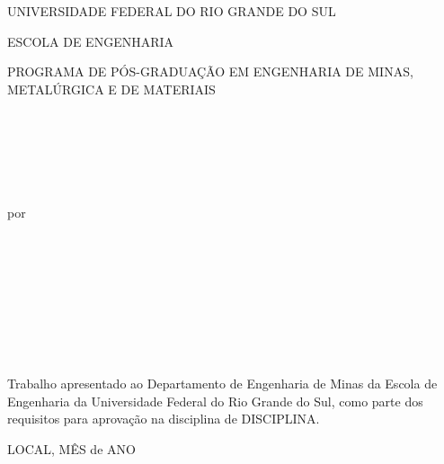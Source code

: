 \renewcommand{\imprimircapa}{%
\begin{capa}%
\center
  UNIVERSIDADE FEDERAL DO RIO GRANDE DO SUL
  \par
ESCOLA DE ENGENHARIA
  \par
  PROGRAMA DE PÓS-GRADUAÇÃO EM ENGENHARIA DE MINAS, METALÚRGICA E DE MATERIAIS 
\\~\\~\\~\\~\\
\imprimirtitulo
\\~\\
por\\~\\~\\
\imprimirautor
\\~\\~\\~\\~\\~\\
\begin{FlushRight}
\parbox{0.5\linewidth}{
\justifying
\parindent=0pt
Trabalho apresentado ao Departamento de \linebreak
Engenharia de Minas da Escola de \linebreak
Engenharia da Universidade Federal do Rio
Grande do Sul, como parte dos requisitos
para aprovação na disciplina de DISCIPLINA.}
\end{FlushRight}
\vspace*{\fill}
LOCAL, MÊS de ANO

\end{capa}}


\imprimircapa
